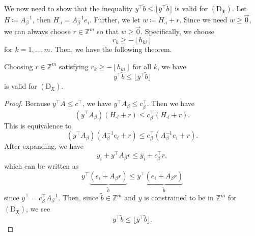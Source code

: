 We now need to show that the inequality \(y^{\top}\widetilde{b}\leq \lfloor \overline{y}^{\top}\widetilde{b} \rfloor\) is valid for \((\mathrm{D}_{\mathfrak{X}})\). Let \(H\coloneqq A^{-1}_{\beta}\), then \(H_{\cdot i} = A^{-1}_{\beta}e_{i}\). Further, we let \(w\coloneqq H_{\cdot i}+r\). Since we need \(w\geq \vec{0}\), we can always choose \(r\in \mathbb{Z}^m\) so that \(w\geq \vec{0}\). Specifically, we choose
\[
	r_k \geq -\left\lfloor h_{ki} \right\rfloor
\]
for \(k = 1, \ldots , m\). Then, we have the following theorem.

\begin{theorem}\label{thm:lec24-2}
	Choosing \(r\in\mathbb{Z} ^m\) satisfying \(r_k \geq - \left\lfloor h_{ki} \right\rfloor\) for all \(k\), we have
	\[
		y^{\top} \widetilde{b} \leq \lfloor \overline{y} ^{\top} \widetilde{b} \rfloor
	\]
	is valid for \((\mathrm{D}_{\mathfrak{X}})\).
\end{theorem}
\begin{proof}
	Because \(y^{\top}A\leq c^{\top}\), we have \(y^{\top}A_{\beta}\leq c_{\beta}^{\top}\). Then we have
	\[
		\left(y^{\top}A_{\beta}\right)\left(H_{\cdot i}+r\right) \leq c_{\beta}^{\top}\left(H_{\cdot i}+r\right).
	\]
	This is equivalence to
	\[
		\left(y^{\top}A_{\beta}\right)\left(A^{-1}_{\beta}e_{i}+r\right) \leq c_{\beta}^{\top}\left(A^{-1}_{\beta}e_{i}+r\right).
	\]
	After expanding, we have
	\[
		y_{i}+y^{\top}A_{\beta}r\leq \overline{y}_{i}+c_{\beta}^{\top}r,
	\]
	which can be written as
	\[
		y^{\top}\underbrace{\left(e_{i}+A_{\beta}r\right)}_{\widetilde{b} } \leq \overline{y}^{\top} \underbrace{\left(e_{i}+A_{\beta}r\right)}_{\widetilde{b}}
	\]
	since \(\overline{y}^{\top} = c_{\beta}^{\top}A^{-1}_{\beta}\). Then, since \(\widetilde{b} \in \mathbb{Z} ^m\) and \(y\) is constrained to be
	in \(\mathbb{Z} ^m\) for \((\mathrm{D}_{\mathfrak{X}})\), we see
	\[
		y^{\top}\widetilde{b}\leq \lfloor \overline{y}^{\top}\widetilde{b} \rfloor.
	\]
\end{proof}

